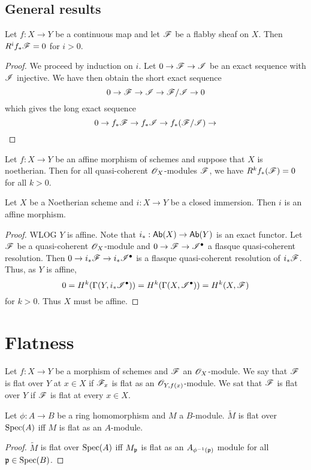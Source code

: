 \documentclass{memoir}
\begin{document}
\subsection{General results}
\begin{proposition}
    Let $f:X\to Y$ be a continuous map and let $\mathscr{F}$ be a flabby sheaf on $X$.
    Then $R^if_*\mathscr{F} = 0$ for $i>0$.
\end{proposition}
\begin{proof}
    We proceed by induction on $i$.
    Let $0\to \mathscr{F}\to \mathscr{I}$ be an exact sequence with $\mathscr{I}$ injective.
    We have then obtain the short exact sequence
    \begin{equation}
        0 \to \mathscr{F}\to \mathscr{I} \to \mathscr{F}/\mathscr{I} \to 0
    \end{equation}
    which gives the long exact sequence
    \begin{equation}
        0 \to f_*\mathscr{F}\to f_*\mathscr{I} \to f_*(\mathscr{F}/\mathscr{I}) \to 
    \end{equation}
\end{proof}
\begin{lemma}
    Let $f:X\to Y$ be an affine morphism of schemes and suppose that $X$ is noetherian.
    Then for all quasi-coherent $\mathscr{O}_X$-modules $\mathscr{F}$, we have $R^kf_*(\mathscr{F}) = 0$ for all $k>0$.
\end{lemma}
\begin{lemma}
    Let $X$ be a Noetherian scheme and $i:X\to Y$ be a closed immersion.
    Then $i$ is an affine morphism.
\end{lemma}
\begin{proof}
    WLOG $Y$ is affine.
    Note that $i_*:{\normalfont\mathsf{Ab}}(X)\to {\normalfont\mathsf{Ab}}(Y)$ is an exact functor.
    Let $\mathscr{F}$ be a quasi-coherent $\mathscr{O}_X$-module and $0\to \mathscr{F}\to \mathscr{I}^\bullet$ a flasque quasi-coherent resolution.
    Then $0 \to i_*\mathscr{F}\to i_*\mathscr{I}^\bullet$ is a flasque quasi-coherent resolution of $i_*\mathscr{F}$.
    Thus, as $Y$ is affine,
    \begin{equation}
        0 = H^k(\Gamma(Y,i_*\mathscr{I}^\bullet)) = H^k(\Gamma(X,\mathscr{I}^\bullet)) = H^k(X,\mathscr{F})
    \end{equation}
    for $k>0$.
    Thus $X$ must be affine.
\end{proof}
\section{Flatness}
\begin{definition}
    Let $f:X\to Y$ be a morphism of schemes and $\mathscr{F}$ an $\mathscr{O}_X$-module.
    We say that $\mathscr{F}$ is flat over $Y$ at $x\in X$ if $\mathscr{F}_x$ is flat as an $\mathscr{O}_{Y,f(x)}$-module.
    We sat that $\mathscr{F}$ is flat over $Y$ if $\mathscr{F}$ is flat at every $x\in X$.
\end{definition}
\begin{proposition}
    Let $\phi:A\to B$ be a ring homomorphism and $M$ a $B$-module.
    $\tilde M$ is flat over $\operatorname{Spec}(A)$ iff $M$ is flat as an $A$-module.
\end{proposition}
\begin{proof}
    $\tilde M$ is flat over $\operatorname{Spec}(A)$ iff $M_{\mathfrak{p}}$ is flat as an $A_{\phi^{-1}(\mathfrak{p})}$ module for all $\mathfrak{p}\in \operatorname{Spec}(B)$.
\end{proof}
\end{document}
